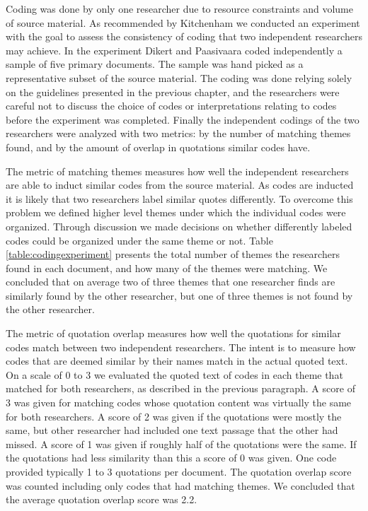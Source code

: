 \documentclass[preprint,authoryear,12pt]{elsarticle}
\begin{document}
Coding was done by only one researcher due to resource constraints and volume of
source material. As recommended by Kitchenham \cite{Kitchenham2007} we conducted
an experiment with the goal to assess the consistency of coding that two
independent researchers may achieve.
In the experiment Dikert and Paasivaara coded independently a sample of five
primary documents. The sample was hand picked as a representative subset of the
source material. The coding was done relying solely on the guidelines presented
in the previous chapter, and the researchers were careful not to discuss the
choice of codes or interpretations relating to codes before the experiment was
completed. Finally the independent codings of the two researchers were analyzed
with two metrics: by the number of matching themes found, and by the amount of
overlap in quotations similar codes have.

The metric of matching themes measures how well the independent researchers are
able to induct similar codes from the source material. As codes are inducted it
is likely that two researchers label similar quotes differently. To overcome
this problem we defined higher level themes under which the individual codes
were organized. Through discussion we made decisions on whether differently
labeled codes could be organized under the same theme or not. Table
\ref{table:codingexperiment} presents the total number of themes the researchers
found in each document, and how many of the themes were matching. We concluded
that on average two of three themes that one researcher finds are similarly
found by the other researcher, but one of three themes is not found by the
other researcher.

The metric of quotation overlap measures how well the quotations for similar
codes match between two independent researchers. The intent is to measure how
codes that are deemed similar by their names match in the actual quoted text. On
a scale of 0 to 3 we evaluated the quoted text of codes in each theme that
matched for both researchers, as described in the previous paragraph. A score of
3 was given for matching codes whose quotation content was virtually the same
for both researchers. A score of 2 was given if the quotations were mostly the
same, but other researcher had included one text passage that the other had
missed. A score of 1 was given if roughly half of the quotations were the same.
If the quotations had less similarity than this a score of 0 was given. One code
provided typically 1 to 3 quotations per document. The quotation overlap score
was counted including only codes that had matching themes. We concluded that the
average quotation overlap score was 2.2.
\end{document}
